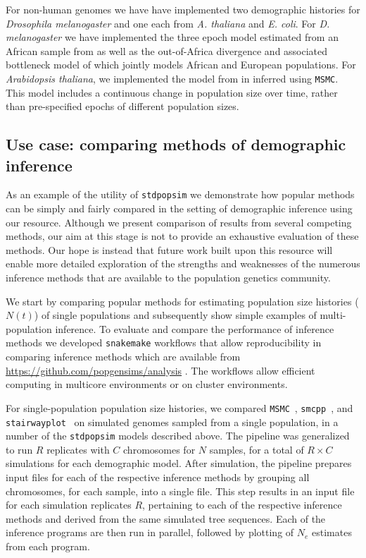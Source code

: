 \documentclass[12pt,halfline,a4paper]{ouparticle}
\newcommand{\stdpopsim}{\texttt{stdpopsim}\xspace}
\newcommand{\MSMC}{\texttt{MSMC}\xspace}
\newcommand{\smcpp}{\texttt{smcpp}\xspace}
\newcommand{\stairwayplot}{\texttt{stairwayplot}\xspace}
\begin{document}
For non-human genomes we have have implemented two demographic histories for
\emph{Drosophila melanogaster} and one each from \emph{A. thaliana} and \emph{E. coli}.
For \emph{D. melanogaster} we have implemented the three epoch model estimated from
an African sample from \cite{sheehan2016deep} as well as the out-of-Africa divergence
and associated bottleneck model of \cite{li2006inferring} which jointly models African
and European populations. For \emph{Arabidopsis thaliana}, we implemented the
model from in \cite{durvasula2017african} inferred using \MSMC. This model includes
a continuous change in population size over time, rather than pre-specified epochs of different
population sizes.


\subsection*{Use case: comparing methods of demographic inference}
As an example of the utility of \stdpopsim we demonstrate how popular
methods can be simply and fairly compared in the setting of demographic
inference using our resource. Although we present comparison of results from several
competing methods, our aim at this stage is not to provide an exhaustive
evaluation of these methods. Our hope is instead that future work built upon this resource
will enable more detailed exploration of the strengths and weaknesses of the numerous
inference methods that are available to the population genetics community.

We start by comparing popular methods for estimating
population size histories ($N(t)$) of single populations and subsequently
show simple examples of multi-population inference.
To evaluate and compare the performance of inference methods we developed
\texttt{snakemake} \citep{koster2012snakemake} workflows that allow reproducibility
in comparing inference methods which are available from \url{https://github.com/popgensims/analysis}
. The workflows allow efficient computing in multicore environments or on
cluster environments.

For single-population population size histories, we compared
\MSMC~\citep{schiffels2014inferring}, \smcpp~\citep{terhorst2017robust}, and
\stairwayplot~\citep{liu2015exploring}
 on simulated genomes sampled from a single population,
in a number of the \stdpopsim models described above. The pipeline was generalized to
run $R$ replicates with $C$ chromosomes for $N$ samples, for a total of $R \times C$
simulations for each demographic model. After simulation, the pipeline prepares
input files for each of the respective inference methods by grouping all
chromosomes, for each sample, into a single file. This step results in an
input file for each simulation replicates $R$, pertaining to each of the
respective inference methods and derived from the same simulated tree sequences.
Each of the inference programs are then run in parallel, followed by plotting of
$N_e$ estimates from each program.
\end{document}
